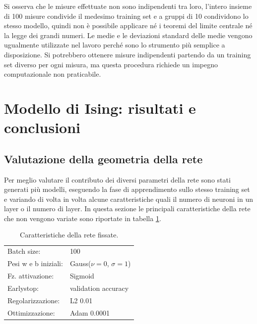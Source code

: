 \documentclass{article}
\begin{document}
Si osserva che le misure effettuate non sono indipendenti tra loro, l'intero insieme di 100 misure condivide il medesimo training set e a gruppi di 10 condividono lo stesso modello, quindi non è possibile applicare né i teoremi del limite centrale né la legge dei grandi numeri.
Le medie e le deviazioni standard delle medie vengono ugualmente utilizzate nel lavoro perché sono lo strumento più semplice a disposizione.
Si potrebbero ottenere misure indipendenti partendo da un training set diverso per ogni misura, ma questa procedura richiede un impegno computazionale non praticabile.


\section{Modello di Ising: risultati e conclusioni}

\subsection{Valutazione della geometria della rete}
Per meglio valutare il contributo dei diversi parametri della rete sono stati generati più modelli, eseguendo la fase di apprendimento sullo stesso training set e variando di volta in volta alcune caratteristiche quali il numero di neuroni in un layer o il numero di layer.
In questa sezione le principali caratteristiche della rete che non vengono variate sono riportate in tabella \ref{tab:ffnnfixed}.

\begin{table}[ht]
\begin{center}
\begin{tabular}{ll}
\toprule
Batch size: & 100\\
Pesi w e b iniziali: & Gauss($\nu=0$, $\sigma=1$)\\
Fz. attivazione: & Sigmoid\\
Earlystop: & validation accuracy \\
Regolarizzazione: & L2 0.01\\
Ottimizzazione: & Adam 0.0001 \\
\bottomrule
\end{tabular}
\end{center}
\caption{Caratteristiche della rete fissate.}
\label{tab:ffnnfixed}
\end{table}
\end{document}
